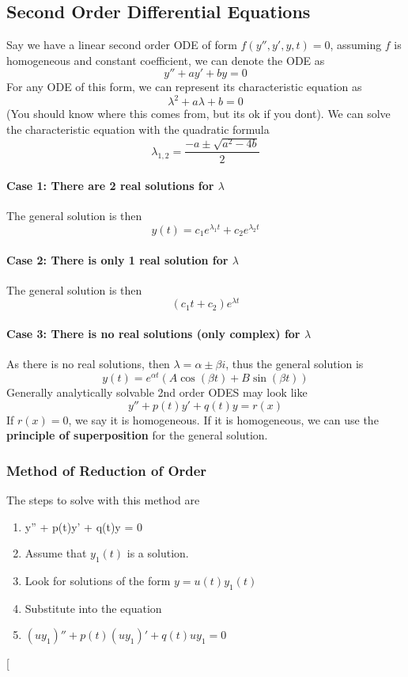 \documentclass{article}
\theoremstyle{remark}
\theoremstyle{definition}
\begin{document}
\begin{landscape}
\begin{multicols*}{3}
 \subsection*{Second Order Differential Equations}
 Say we have a linear second order ODE of form \( f(y'', y', y, t) = 0 \),
 assuming \( f \) is homogeneous and constant coefficient, we can denote the
 ODE as
 \[ 
   y'' + ay' + by = 0
 \]
 For any ODE of this form, we can represent its characteristic equation as 
 \[ 
   \lambda^2 + a\lambda + b = 0
 \]
 (You should know where this comes from, but its ok if you dont). We can solve
 the characteristic equation with the quadratic formula
 \[ 
 \lambda_{1,2} = \frac{-a \pm \sqrt{a^2 - 4b}}{2}
 \]
 \paragraph{Case 1: There are 2 real solutions for \( \lambda \)}
 The general solution is then \[ 
   y(t) = c_1 e^{\lambda_1 t} + c_2 e^{\lambda_2 t}
 \]
 \paragraph{Case 2: There is only 1 real solution for \( \lambda \)}
 The general solution is then \[ 
   (c_1t + c_2)e^{\lambda t}
 \]
 \paragraph{Case 3: There is no real solutions (only complex) for \( \lambda \)}
 As there is no real solutions, then \( \lambda = \alpha \pm \beta i\), thus
 the general solution is
 \[ 
   y(t) = e^{\alpha t}(A\cos(\beta t) + B\sin (\beta t))
 \]
 Generally analytically solvable 2nd order ODES may look like
 \[ 
   y'' + p(t)y' + q(t)y = r(x)
 \]
 If \( r(x) = 0 \), we say it is homogeneous. If it is homogeneous, we can use
 the \textbf{principle of superposition} for the general solution.
 \subsubsection*{Method of Reduction of Order}
 The steps to solve with this method are
 \begin{enumerate}
   \item y'' + p(t)y' + q(t)y = 0
   \item Assume that \( y_1(t) \) is a solution.
   \item Look for solutions of the form \( y = u(t)y_1(t) \)
   \item Substitute into the equation
   \item \( (uy_1)'' + p(t)(uy_1)' + q(t)uy_1 = 0 \)
 \end{enumerate}
 \end{multicols*}
 \newpage
 \begin{multicols*}{3}
   [

\end{multicols*}
\end{landscape}
\end{document}
